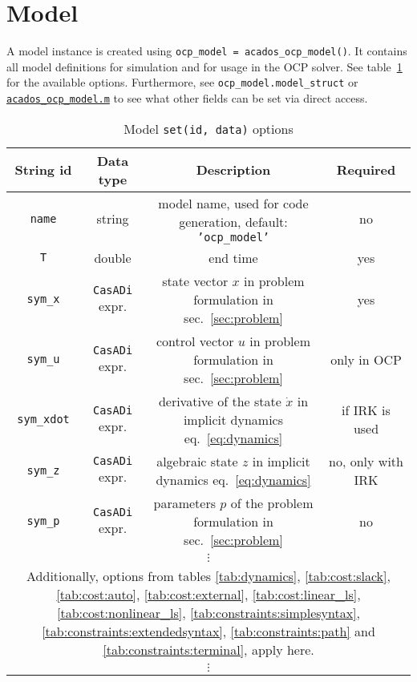 \documentclass[english]{article}
\newcommand{\code}[1]{\texttt{#1}}
\newcommand{\str}[1]{\texttt{'#1'}}
\newcommand{\casadi}{\texttt{CasADi}}
\newcommand{\mandatory}{yes}
\newcommand{\optional}{no}
\begin{document}
\section{Model}\label{sec:model}
%
A model instance is created using \code{ocp\_model = acados\_ocp\_model()}. It contains all model definitions for simulation and for usage in the OCP solver.
See table~\ref{tab:model:options} for the available options.
Furthermore, see \code{ocp\_model.model\_struct} or \href{https://github.com/acados/acados/blob/master/interfaces/acados_matlab_octave/acados_ocp_model.m}{\code{acados\_ocp\_model.m}} to see what other fields can be set via direct access.
%
\begin{table}
    \centering
    \caption{Model \code{set(id, data)} options}
    \label{tab:model:options}
    \begin{tabular}{cccc}
        \toprule
        String id & Data type & Description & Required\\
        \midrule
        \code{name} & string & model name, used for code generation, default: \str{ocp\_model} & \optional \\
        \code{T} & double & end time & \mandatory \\
        \code{sym\_x} & \casadi{} expr. & state vector $x$ in problem formulation in sec.~\ref{sec:problem} & \mandatory \\
        \code{sym\_u} & \casadi{} expr. & control vector $u$ in problem formulation in sec.~\ref{sec:problem} & only in OCP \\
        \code{sym\_xdot} & \casadi{} expr. & derivative of the state $\dot{x}$ in implicit dynamics eq.~\eqref{eq:dynamics} & if IRK is used \\
        \code{sym\_z} & \casadi{} expr. & algebraic state $z$ in implicit dynamics eq.~\eqref{eq:dynamics} & \optional, only with IRK \\
        \code{sym\_p} & \casadi{} expr. & parameters $p$ of the problem formulation in sec.~\ref{sec:problem} & \optional \\
        \multicolumn{4}{c}{$\vdots$}\\
        \multicolumn{4}{c}{Additionally, options from tables \ref{tab:dynamics}, \ref{tab:cost:slack}, \ref{tab:cost:auto}, \ref{tab:cost:external}, \ref{tab:cost:linear_ls}, \ref{tab:cost:nonlinear_ls}, %
        \ref{tab:constraints:simplesyntax}, \ref{tab:constraints:extendedsyntax}, \ref{tab:constraints:path} and \ref{tab:constraints:terminal}, apply here.}\\
        \multicolumn{4}{c}{$\vdots$}\\
        \bottomrule
    \end{tabular}%
\end{table}%
%
\end{document}
